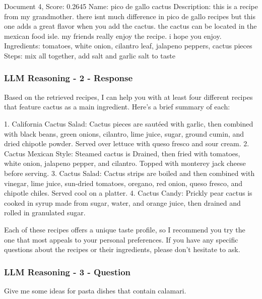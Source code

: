 \documentclass[a4paper,11pt]{article}
\begin{document}
Document 4, Score: 0.2645
Name: pico de gallo cactus
Description: this is a recipe from my grandmother. there isnt much difference in pico de gallo recipes but this one adds a great flavor when you add the cactus. the cactus can be located in the mexican food isle. my friends really enjoy the recipe. i hope you enjoy.
Ingredients: tomatoes, white onion, cilantro leaf, jalapeno peppers, cactus pieces
Steps: mix all together, add salt and garlic salt to taste


\subsubsection{LLM Reasoning - 2 - Response}
Based on the retrieved recipes, I can help you with at least four different recipes that feature cactus as a main ingredient. Here's a brief summary of each:

1. California Cactus Salad: Cactus pieces are sautéed with garlic, then combined with black beans, green onions, cilantro, lime juice, sugar, ground cumin, and dried chipotle powder. Served over lettuce with queso fresco and sour cream.
2. Cactus Mexican Style: Steamed cactus is Drained, then fried with tomatoes, white onion, jalapeno pepper, and cilantro. Topped with monterey jack cheese before serving.
3. Cactus Salad: Cactus strips are boiled and then combined with vinegar, lime juice, sun-dried tomatoes, oregano, red onion, queso fresco, and chipotle chiles. Served cool on a platter.
4. Cactus Candy: Prickly pear cactus is cooked in syrup made from sugar, water, and orange juice, then drained and rolled in granulated sugar.

Each of these recipes offers a unique taste profile, so I recommend you try the one that most appeals to your personal preferences. If you have any specific questions about the recipes or their ingredients, please don't hesitate to ask.



\subsubsection{LLM Reasoning - 3 - Question}
Give me some ideas for pasta dishes that contain calamari.
\end{document}
